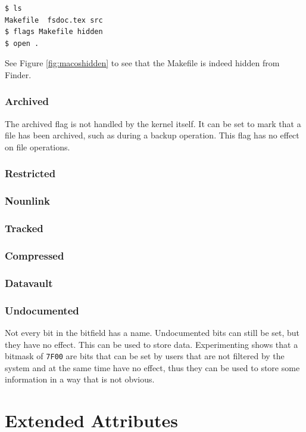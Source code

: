 \documentclass[a4paper]{article}
\begin{document}
\begin{verbatim}
$ ls
Makefile  fsdoc.tex src
$ flags Makefile hidden
$ open .
\end{verbatim}
See Figure \ref{fig:macoshidden} to see that the Makefile is indeed hidden from Finder.

\subsubsection{Archived}

The archived flag is not handled by the kernel itself. It can be set to mark that a file has been archived, such as during a backup operation. This flag has no effect on file operations.

\subsubsection{Restricted}

\subsubsection{Nounlink}

\subsubsection{Tracked}

\subsubsection{Compressed}

\subsubsection{Datavault}

\subsubsection{Undocumented}

Not every bit in the bitfield has a name. Undocumented bits can still be set, but they have no effect. This can be used to store data. Experimenting shows that a bitmask of \verb|7F00| are bits that can be set by users that are not filtered by the system and at the same time have no effect, thus they can be used to store some information in a way that is not obvious.

\section{Extended Attributes}
\end{document}
